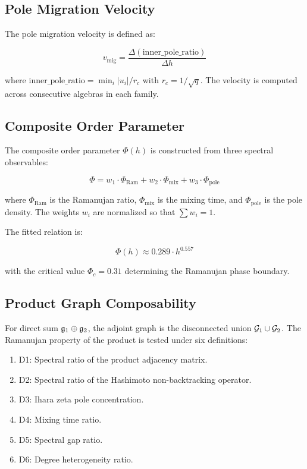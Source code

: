 \subsection{Pole Migration Velocity}\label{app:pole_migration}

The pole migration velocity is defined as:

\begin{equation}
v_{\mathrm{mig}} = \frac{\Delta(\mathrm{inner\_pole\_ratio})}{\Delta h}
\end{equation}

where $\mathrm{inner\_pole\_ratio} = \min_i |u_i| / r_c$ with $r_c = 1/\sqrt{q}$. The velocity is computed across consecutive algebras in each family.

\subsection{Composite Order Parameter}\label{app:order_parameter}

The composite order parameter $\Phi(h)$ is constructed from three spectral observables:

\begin{equation}
\Phi = w_1 \cdot \Phi_{\mathrm{Ram}} + w_2 \cdot \Phi_{\mathrm{mix}} + w_3 \cdot \Phi_{\mathrm{pole}}
\end{equation}

where $\Phi_{\mathrm{Ram}}$ is the Ramanujan ratio, $\Phi_{\mathrm{mix}}$ is the mixing time, and $\Phi_{\mathrm{pole}}$ is the pole density. The weights $w_i$ are normalized so that $\sum w_i = 1$.

The fitted relation is:

\begin{equation}
\Phi(h) \approx 0.289 \cdot h^{0.557}
\end{equation}

with the critical value $\Phi_c = 0.31$ determining the Ramanujan phase boundary.

\subsection{Product Graph Composability}\label{app:composability_details}

For direct sum $\mathfrak{g}_1 \oplus \mathfrak{g}_2$, the adjoint graph is the disconnected union $\mathcal{G}_1 \cup \mathcal{G}_2$. The Ramanujan property of the product is tested under six definitions:

\begin{enumerate}
    \item D1: Spectral ratio of the product adjacency matrix.
    \item D2: Spectral ratio of the Hashimoto non-backtracking operator.
    \item D3: Ihara zeta pole concentration.
    \item D4: Mixing time ratio.
    \item D5: Spectral gap ratio.
    \item D6: Degree heterogeneity ratio.
\end{enumerate}

